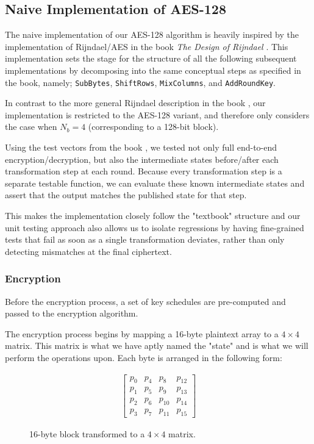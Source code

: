 \subsection{Naive Implementation of AES-128}

The naive implementation of our AES-128 algorithm is heavily inspired by the implementation of Rijndael/AES in the book \textit{The Design of Rijndael} \cite{rijndael}. This implementation sets the stage for the structure of all the following subsequent implementations by decomposing into the same conceptual steps as specified in the book, namely; \texttt{SubBytes}, \texttt{ShiftRows}, \texttt{MixColumns}, and \texttt{AddRoundKey}.

In contrast to the more general Rijndael description in the book \cite{rijndael},
our implementation is restricted to the AES-128 variant, and therefore
only considers the case when $N_{b} = 4$ (corresponding to a 128-bit block).

Using the test vectors from the book \cite{rijndael_test_vectors}, we tested not only full end-to-end encryption/decryption, but also the intermediate states before/after each transformation step at each round. Because every transformation step is a separate testable function, we can evaluate these known intermediate states and assert that the output matches the published state for that step.

This makes the implementation closely follow the "textbook" structure and our unit testing approach also allows us to isolate regressions by having fine-grained tests that fail as soon as a single transformation deviates, rather than only detecting mismatches at the final ciphertext.

\subsubsection{Encryption}

Before the encryption process, a set of key schedules are pre-computed and passed to the encryption algorithm.

The encryption process begins by mapping a 16-byte plaintext array to a $4 \times 4$ matrix. This matrix is what we have aptly named the "state" and is what we will perform the operations upon. Each byte is arranged in the following form:

\begin{figure}[H]
    \begin{align*}
        \begin{bmatrix}
            p_{0} & p_{4} & p_{8} & p_{12} \\
            p_{1} & p_{5} & p_{9} & p_{13} \\
            p_{2} & p_{6} & p_{10} & p_{14} \\
            p_{3} & p_{7} & p_{11} & p_{15}
        \end{bmatrix}
    \end{align*}
    \caption{16-byte block transformed to a $4 \times 4$ matrix.}
    \label{fig:state_matrix}
\end{figure}

